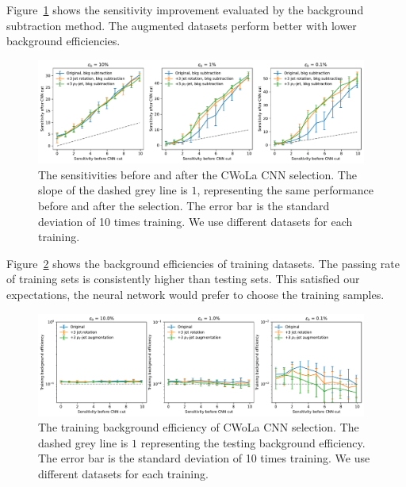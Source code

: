 \documentclass[12pt]{article}
\begin{document}
        Figure~\ref{fig:sensitivity_improvement_background_subtraction} shows the sensitivity improvement evaluated by the background subtraction method. The augmented datasets perform better with lower background efficiencies. 
        \begin{figure}[htpb]
            \centering
            \includegraphics[width=0.97\textwidth]{HVmodel_sensitivity_improvement_origin_jet_aug_3_pt_jet_aug_3_bkg_subtraction.pdf}
            \caption{The sensitivities before and after the CWoLa CNN selection. The slope of the dashed grey line is $1$, representing the same performance before and after the selection. The error bar is the standard deviation of 10 times training. We use different datasets for each training.}
            \label{fig:sensitivity_improvement_background_subtraction}
        \end{figure}

        Figure~\ref{fig:train_background_passing_rate} shows the background efficiencies of training datasets. The passing rate of training sets is consistently higher than testing sets. This satisfied our expectations, the neural network would prefer to choose the training samples.
        \begin{figure}[htpb]
            \centering
            \includegraphics[width=0.97\textwidth]{HVmodel_train_B_passing_rate_origin_jet_aug_3_pt_jet_aug_3.pdf}
            \caption{The training background efficiency of CWoLa CNN selection. The dashed grey line is $1$ representing the testing background efficiency. The error bar is the standard deviation of 10 times training. We use different datasets for each training.}
            \label{fig:train_background_passing_rate}
        \end{figure}
\end{document}
